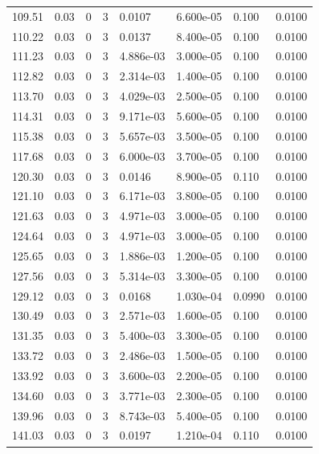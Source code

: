 \documentclass[preview]{standalone}
\begin{document}
{{{{\begin{tabular}{L{1.2cm}C{1.2cm} C{0.3cm}C{0.5cm} C{1.4cm}C{1.4cm} C{1.4cm}C{1.4cm}}
  109.51  &  0.03  & 0     &  3 &  0.0107  & 6.600e-05  & 0.100 &  0.0100   \\ 
  110.22  &  0.03  & 0     &  3 &  0.0137  & 8.400e-05  & 0.100 &  0.0100   \\ 
  111.23  &  0.03  & 0     &  3 &  4.886e-03  & 3.000e-05  & 0.100 &  0.0100   \\ 
  112.82  &  0.03  & 0     &  3 &  2.314e-03  & 1.400e-05  & 0.100 &  0.0100   \\ 
  113.70  &  0.03  & 0     &  3 &  4.029e-03  & 2.500e-05  & 0.100 &  0.0100   \\ 
  114.31  &  0.03  & 0     &  3 &  9.171e-03  & 5.600e-05  & 0.100 &  0.0100   \\ 
  115.38  &  0.03  & 0     &  3 &  5.657e-03  & 3.500e-05  & 0.100 &  0.0100   \\ 
  117.68  &  0.03  & 0     &  3 &  6.000e-03  & 3.700e-05  & 0.100 &  0.0100   \\ 
  120.30  &  0.03  & 0     &  3 &  0.0146  & 8.900e-05  & 0.110 &  0.0100   \\ 
  121.10  &  0.03  & 0     &  3 &  6.171e-03  & 3.800e-05  & 0.100 &  0.0100   \\ 
  121.63  &  0.03  & 0     &  3 &  4.971e-03  & 3.000e-05  & 0.100 &  0.0100   \\ 
  124.64  &  0.03  & 0     &  3 &  4.971e-03  & 3.000e-05  & 0.100 &  0.0100   \\ 
  125.65  &  0.03  & 0     &  3 &  1.886e-03  & 1.200e-05  & 0.100 &  0.0100   \\ 
  127.56  &  0.03  & 0     &  3 &  5.314e-03  & 3.300e-05  & 0.100 &  0.0100   \\ 
  129.12  &  0.03  & 0     &  3 &  0.0168  & 1.030e-04  & 0.0990 &  0.0100   \\ 
  130.49  &  0.03  & 0     &  3 &  2.571e-03  & 1.600e-05  & 0.100 &  0.0100   \\ 
  131.35  &  0.03  & 0     &  3 &  5.400e-03  & 3.300e-05  & 0.100 &  0.0100   \\ 
  133.72  &  0.03  & 0     &  3 &  2.486e-03  & 1.500e-05  & 0.100 &  0.0100   \\ 
  133.92  &  0.03  & 0     &  3 &  3.600e-03  & 2.200e-05  & 0.100 &  0.0100   \\ 
  134.60  &  0.03  & 0     &  3 &  3.771e-03  & 2.300e-05  & 0.100 &  0.0100   \\ 
  139.96  &  0.03  & 0     &  3 &  8.743e-03  & 5.400e-05  & 0.100 &  0.0100   \\ 
  141.03  &  0.03  & 0     &  3 &  0.0197  & 1.210e-04  & 0.110 &  0.0100   \\ 

\end{tabular}}}}}
\end{document}
